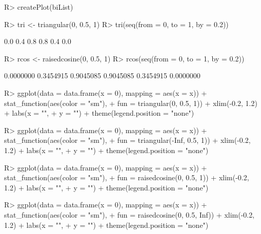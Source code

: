 \documentclass{article}\usepackage[]{graphicx}\usepackage[]{color}
\begin{document}
\begin{Schunk}
\begin{Sinput}
R> createPlot(biList)
\end{Sinput}
\end{Schunk}

\begin{Schunk}
% --begin: "triangular"
\begin{Sinput}
R> tri <- triangular(0, 0.5, 1)
R> tri(seq(from = 0, to = 1, by = 0.2))
\end{Sinput}
\begin{Soutput}
[1] 0.0 0.4 0.8 0.8 0.4 0.0
\end{Soutput}
\begin{Sinput}
R> rcos <- raisedcosine(0, 0.5, 1)
R> rcos(seq(from = 0, to = 1, by = 0.2))
\end{Sinput}
\begin{Soutput}
[1] 0.0000000 0.3454915 0.9045085 0.9045085 0.3454915 0.0000000
\end{Soutput}
%
% --end: "triangular"
\end{Schunk}

\begin{Schunk}
\begin{Sinput}
R> ggplot(data = data.frame(x = 0), mapping = aes(x = x)) + stat_function(aes(color = "sm"), 
+      fun = triangular(0, 0.5, 1)) + xlim(-0.2, 1.2) + labs(x = "", 
+      y = "") + theme(legend.position = "none")
\end{Sinput}
\end{Schunk}

\begin{Schunk}
\begin{Sinput}
R> ggplot(data = data.frame(x = 0), mapping = aes(x = x)) + stat_function(aes(color = "sm"), 
+      fun = triangular(-Inf, 0.5, 1)) + xlim(-0.2, 1.2) + labs(x = "", 
+      y = "") + theme(legend.position = "none")
\end{Sinput}
\end{Schunk}

\begin{Schunk}
\begin{Sinput}
R> ggplot(data = data.frame(x = 0), mapping = aes(x = x)) + stat_function(aes(color = "sm"), 
+      fun = raisedcosine(0, 0.5, 1)) + xlim(-0.2, 1.2) + labs(x = "", 
+      y = "") + theme(legend.position = "none")
\end{Sinput}
\end{Schunk}

\begin{Schunk}
\begin{Sinput}
R> ggplot(data = data.frame(x = 0), mapping = aes(x = x)) + stat_function(aes(color = "sm"), 
+      fun = raisedcosine(0, 0.5, Inf)) + xlim(-0.2, 1.2) + labs(x = "", 
+      y = "") + theme(legend.position = "none")
\end{Sinput}
\end{Schunk}
\end{document}

